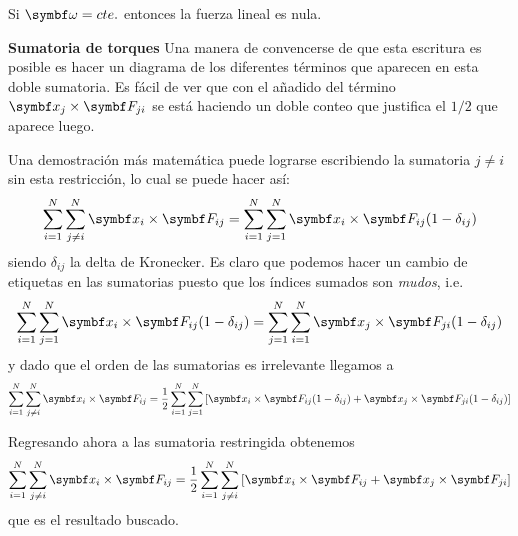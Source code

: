\documentclass[10pt,oneside]{CBFT_book}
\begin{document}
Si $\vb{\omega} = cte.$ entonces la fuerza lineal es nula.


\begin{notasfinales}

\label{nota_suma_ineqj}
\item{ \bf Sumatoria de torques}
Una manera de convencerse de que esta escritura es posible es hacer un diagrama de los diferentes términos que
aparecen en esta doble sumatoria. Es fácil de ver que con el añadido del término $\vb{x}_j \times \vb{F}_{ji} $ se está 
haciendo un doble conteo que justifica el $1/2$ que aparece luego.

Una demostración más matemática puede lograrse escribiendo la sumatoria $ j\neq i $ sin esta restricción, lo cual se 
puede hacer así:
\[
	\Sum{i=1}{N} \Sum{j\neq i}{N}  \vb{x}_i \times \vb{F}_{ij} = 
	\Sum{i=1}{N} \Sum{j=1}{N}  \vb{x}_i \times \vb{F}_{ij} ( 1 - \delta_{ij} )
\]
siendo $ \delta_{ij} $ la delta de Kronecker. Es claro que podemos hacer un cambio de etiquetas en las sumatorias 
puesto que los índices sumados son {\it mudos}, i.e.
\[
	\Sum{i=1}{N} \Sum{j=1}{N}  \vb{x}_i \times \vb{F}_{ij} ( 1 - \delta_{ij} ) = 
	\Sum{j=1}{N} \Sum{i=1}{N}  \vb{x}_j \times \vb{F}_{ji} ( 1 - \delta_{ij} )
\]
y dado que el orden de las sumatorias es irrelevante llegamos a
\[
	\Sum{i=1}{N} \Sum{j\neq i}{N}  \vb{x}_i \times \vb{F}_{ij} = \frac{1}{2}
	\Sum{i=1}{N} \Sum{j=1}{N} \left[ \vb{x}_i \times \vb{F}_{ij} ( 1 - \delta_{ij} ) +
	\vb{x}_j \times \vb{F}_{ji} ( 1 - \delta_{ij} )
	\right] 
\]

Regresando ahora a las sumatoria restringida obtenemos 
\[
	\Sum{i=1}{N} \Sum{j\neq i}{N}  \vb{x}_i \times \vb{F}_{ij} = \frac{1}{2}
	\Sum{i=1}{N} \Sum{j \neq i }{N} \left[ \vb{x}_i \times \vb{F}_{ij} + \vb{x}_j \times \vb{F}_{ji} \right] 
\]
que es el resultado buscado.


\end{notasfinales}



\end{document}
